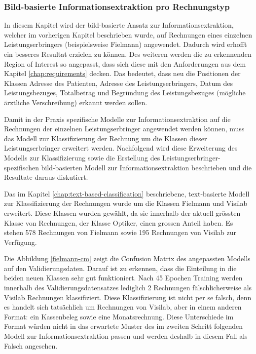 \subsubsection{Bild-basierte Informationsextraktion pro Rechnungstyp}
In diesem Kapitel wird der bild-basierte Ansatz zur Informationsextraktion, welcher im vorherigen Kapitel beschrieben wurde, auf Rechnungen eines einzelnen Leistungserbringers (beispielsweise Fielmann) angewendet. Dadurch wird erhofft ein besseres Resultat erzielen zu können. Des weiteren werden die zu erkennenden Region of Interest so angepasst, dass sich diese mit den Anforderungen aus dem Kapitel \ref{chap:requirements} decken. Das bedeutet, dass neu die Positionen der Klassen Adresse des Patienten, Adresse des Leistungserbringers, Datum des Leistungsbezuges, Totalbetrag und Begründung des Leistungsbezuges (mögliche ärztliche Verschreibung) erkannt werden sollen.

Damit in der Praxis spezifische Modelle zur Informationsextraktion auf die Rechnungen der einzelnen Leistungserbringer angewendet werden können, muss das Modell zur Klassifizierung der Rechnung um die Klassen dieser Leistungserbringer erweitert werden. Nachfolgend wird diese Erweiterung des Modells zur Klassifizierung sowie die Erstellung des Leistungserbringer-spezifischen bild-basierten Modell zur Informationsextraktion beschrieben und die Resultate daraus diskutiert.

Das im Kapitel \ref{chap:text-based-classification} beschriebene, text-basierte Modell zur Klassifizierung der Rechnungen wurde um die Klassen Fielmann und Visilab erweitert. Diese Klassen wurden gewählt, da sie innerhalb der aktuell grössten Klasse von Rechnungen, der Klasse Optiker, einen grossen Anteil haben. Es stehen 578 Rechnungen von Fielmann sowie 195 Rechnungen von Visilab zur Verfügung.

Die Abbildung \ref{fielmann-cm} zeigt die Confusion Matrix des angepassten Modells auf den Validierungsdaten. Darauf ist zu erkennen, dass die Einteilung in die beiden neuen Klassen sehr gut funktioniert. Nach 45 Epochen Training werden innerhalb des Validierungsdatensatzes lediglich 2 Rechnungen fälschlicherweise als Visilab Rechnungen klassifiziert. Diese Klassifizierung ist nicht per se falsch, denn es handelt sich tatsächlich um Rechnungen von Visilab, aber in einem anderen Format: ein Kassenbeleg sowie eine Monatsrechnung. Diese Unterschiede im Format würden nicht in das erwartete Muster des im zweiten Schritt folgenden Modell zur Informationsextraktion passen und werden deshalb in diesem Fall als Falsch angesehen.

